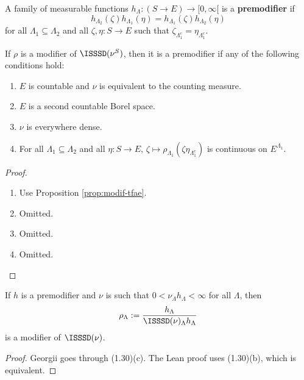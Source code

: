 \begin{definition}
    \label{def:premodif}
    \leanok

    A family of measurable functions $h_\Lambda : (S \to E) \to [0, \infty[$ is a {\bf premodifier} if
    $$h_{\Lambda_2}(\zeta)h_{\Lambda_1}(\eta) = h_{\Lambda_1}(\zeta)h_{\Lambda_2}(\eta)$$
    for all $\Lambda_1 \subseteq \Lambda_2$ and all $\zeta, \eta : S \to E$ such that $\zeta_{\Lambda_1^c} = \eta_{\Lambda_1^c}$.
\end{definition}

\begin{lemma}
    \label{lem:modif-premodif}
    If $\rho$ is a modifier of $\ISSSD(\nu^S)$, then it is a premodifier if any of the following conditions hold:
    \begin{enumerate}
        \item $E$ is countable and $\nu$ is equivalent to the counting measure.
        \item $E$ is a second countable Borel space.
        \item $\nu$ is everywhere dense.
        \item For all $\Lambda_1 \subseteq \Lambda_2$ and all $\eta : S \to E$, $\zeta \mapsto \rho_{\Lambda_1}(\zeta \eta_{\Lambda_1^c})$ is continuous on $E^{\Lambda_1}$.
    \end{enumerate}
\end{lemma}
\begin{proof}

    \begin{enumerate}
        \item Use Proposition \ref{prop:modif-tfae}.
        \item Omitted.
        \item Omitted.
        \item Omitted.
    \end{enumerate}
\end{proof}

\begin{lemma}
    \label{lem:premodif-modif}
    \leanok
    If $h$ is a premodifier and $\nu$ is such that $0 < \nu_\Lambda h_\Lambda < \infty$ for all $\Lambda$, then
    $$\rho_\Lambda := \frac{h_\Lambda}{\ISSSD(\nu)_\Lambda h_\Lambda}$$
    is a modifier of $\ISSSD(\nu)$.
\end{lemma}
\begin{proof}

    Georgii goes through (1.30)(c). The Lean proof uses (1.30)(b), which is equivalent.
\end{proof}

